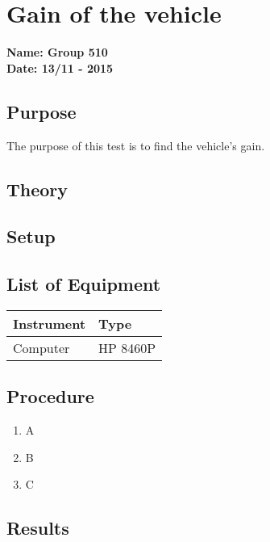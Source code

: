 \pagebreak
\section{Gain of the vehicle} %
\textbf{Name: Group 510}\\
\textbf{Date: 13/11 - 2015}

\subsection{Purpose}
The purpose of this test is to find the vehicle's gain.

\subsection{Theory}


\subsection{Setup}

\subsection{List of Equipment}

\begin{table}[H]
\begin{tabular}{|p{10cm}|p{4cm}|}
\hline%
  \textbf{Instrument}                     &  \textbf{Type}       \\
\hline%
  Computer                                &  HP 8460P    \\
\hline %
\end{tabular}
\end{table}

\subsection{Procedure}

\begin{enumerate}
  \item A
  \item B
  \item C
\end{enumerate}

\subsection{Results}


